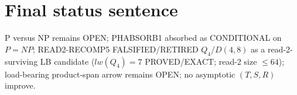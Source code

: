 \documentclass[11pt]{article}
\begin{document}
\section*{Final status sentence}
P versus NP remains OPEN; PHABSORB1 absorbed as CONDITIONAL on $P=NP$; READ2-RECOMP5 FALSIFIED/RETIRED $Q_4$/$D(4,8)$ as a read-2-surviving LB candidate ($lw(Q_4)=7$ PROVED/EXACT; read-2 size $\le64$); load-bearing product-span arrow remains OPEN; no asymptotic $(T,S,R)$ improve.
\end{document}
